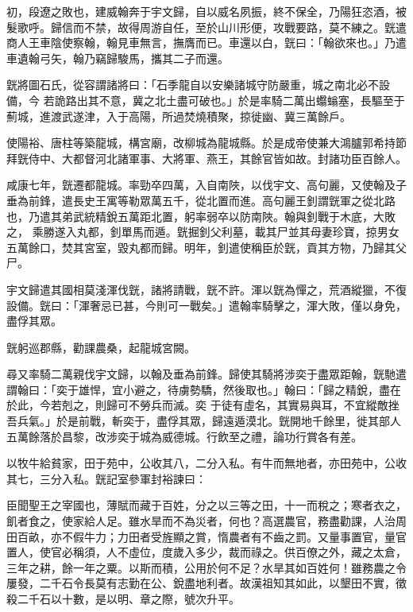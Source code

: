 \begin{pinyinscope}
 初，段遼之敗也，建威翰奔于宇文歸，自以威名夙振，終不保全，乃陽狂恣酒，被髮歌呼。歸信而不禁，故得周游自任，至於山川形便，攻戰要路，莫不練之。皝遣商人王車陰使察翰，翰見車無言，撫膺而已。車還以白，皝曰：「翰欲來也。」乃遣車遺翰弓矢，翰乃竊歸駿馬，攜其二子而還。



 皝將圖石氏，從容謂諸將曰：「石季龍自以安樂諸城守防嚴重，城之南北必不設備，今
 若詭路出其不意，冀之北土盡可破也。」於是率騎二萬出蠮螉塞，長驅至于薊城，進渡武遂津，入于高陽，所過焚燒積聚，掠徙幽、冀三萬餘戶。



 使陽裕、唐柱等築龍城，構宮廟，改柳城為龍城縣。於是成帝使兼大鴻臚郭希持節拜皝侍中、大都督河北諸軍事、大將軍、燕王，其餘官皆如故。封諸功臣百餘人。



 咸康七年，皝遷都龍城。率勁卒四萬，入自南陜，以伐宇文、高句麗，又使翰及子垂為前鋒，遣長史王寓等勒眾萬五千，從北置而進。高句麗王釗謂皝軍之從北路也，乃遣其弟武統精銳五萬距北置，躬率弱卒以防南陜。翰與釗戰于木底，大敗之，
 乘勝遂入丸都，釗單馬而遁。皝掘釗父利墓，載其尸並其母妻珍寶，掠男女五萬餘口，焚其宮室，毀丸都而歸。明年，釗遣使稱臣於皝，貢其方物，乃歸其父尸。



 宇文歸遣其國相莫淺渾伐皝，諸將請戰，皝不許。渾以皝為憚之，荒酒縱獵，不復設備。皝曰：「渾奢忌已甚，今則可一戰矣。」遣翰率騎擊之，渾大敗，僅以身免，盡俘其眾。



 皝躬巡郡縣，勸課農桑，起龍城宮闕。



 尋又率騎二萬親伐宇文歸，以翰及垂為前鋒。歸使其騎將涉奕于盡眾距翰，皝馳遣謂翰曰：「奕于雄悍，宜小避之，待虜勢驕，然後取也。」翰曰：「歸之精銳，盡在於此，今若剋之，則歸可不勞兵而滅。奕
 于徒有虛名，其實易與耳，不宜縱敵挫吾兵氣。」於是前戰，斬奕于，盡俘其眾，歸遠遁漠北。皝開地千餘里，徙其部人五萬餘落於昌黎，改涉奕于城為威德城。行飲至之禮，論功行賞各有差。



 以牧牛給貧家，田于苑中，公收其八，二分入私。有牛而無地者，亦田苑中，公收其七，三分入私。皝記室參軍封裕諫曰：



 臣聞聖王之宰國也，薄賦而藏于百姓，分之以三等之田，十一而稅之；寒者衣之，飢者食之，使家給人足。雖水旱而不為災者，何也？高選農官，務盡勸課，人治周田百畝，亦不假牛力；力田者受旌顯之賞，惰農者有不齒之罰。又量事置官，量官
 置人，使官必稱須，人不虛位，度歲入多少，裁而祿之。供百僚之外，藏之太倉，三年之耕，餘一年之粟。以斯而積，公用於何不足？水旱其如百姓何！雖務農之令屢發，二千石令長莫有志勤在公、銳盡地利者。故漢祖知其如此，以墾田不實，徵殺二千石以十數，是以明、章之際，號次升平。




\end{pinyinscope}
